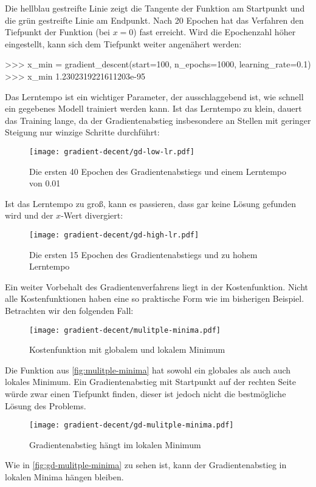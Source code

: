 \noindent
Die hellblau gestreifte Linie zeigt die Tangente der Funktion am Startpunkt und
die grün gestreifte Linie am Endpunkt. Nach 20 Epochen hat das Verfahren
den Tiefpunkt der Funktion (bei $x = 0$) fast erreicht.
Wird die Epochenzahl höher eingestellt, kann sich dem Tiefpunkt weiter angenähert werden:
\begin{pyconcode}
>>> x_min = gradient_descent(start=100, n_epochs=1000, learning_rate=0.1)
>>> x_min
1.2302319221611203e-95
\end{pyconcode}
Das Lerntempo ist ein wichtiger Parameter, der ausschlaggebend ist,
wie schnell ein gegebenes Modell trainiert werden kann.
Ist das Lerntempo zu klein, dauert das Training lange,
da der Gradientenabstieg insbesondere an Stellen mit geringer Steigung nur
winzige Schritte durchführt:
\begin{figure}[h!]
  \centering
  \texttt{[image: gradient-decent/gd-low-lr.pdf]}
  \caption{Die ersten 40 Epochen des Gradientenabstiegs und einem Lerntempo von \num{0.01}}
  \label{fig:gd-low-lr}
\end{figure}

\noindent
Ist das Lerntempo zu groß, kann es passieren, dass gar keine Lösung gefunden wird
und der $x$-Wert divergiert:
\newpage
\begin{figure}[h!]
  \centering
  \texttt{[image: gradient-decent/gd-high-lr.pdf]}
  \caption{Die ersten 15 Epochen des Gradientenabstiegs und zu hohem Lerntempo}
  \label{fig:gd-high-lr}
\end{figure}

\noindent
Ein weiter Vorbehalt des Gradientenverfahrens liegt in der Kostenfunktion.
Nicht alle Kostenfunktionen haben eine so praktische Form wie im bisherigen Beispiel.
Betrachten wir den folgenden Fall:
\begin{figure}[h!]
  \centering
  \texttt{[image: gradient-decent/mulitple-minima.pdf]}
  \caption{Kostenfunktion mit globalem und lokalem Minimum}
  \label{fig:mulitple-minima}
\end{figure}

\noindent
Die Funktion aus \autoref{fig:mulitple-minima} hat sowohl ein globales als auch auch
lokales Minimum. Ein Gradientenabstieg mit Startpunkt auf der rechten Seite würde
zwar einen Tiefpunkt finden, dieser ist jedoch nicht die bestmögliche Lösung des Problems.
\begin{figure}[h!]
  \centering
  \texttt{[image: gradient-decent/gd-mulitple-minima.pdf]}
  \caption{Gradientenabstieg hängt im lokalen Minimum}
  \label{fig:gd-mulitple-minima}
\end{figure}

\noindent
Wie in \autoref{fig:gd-mulitple-minima} zu sehen ist, kann
der Gradientenabstieg in lokalen Minima hängen bleiben.
